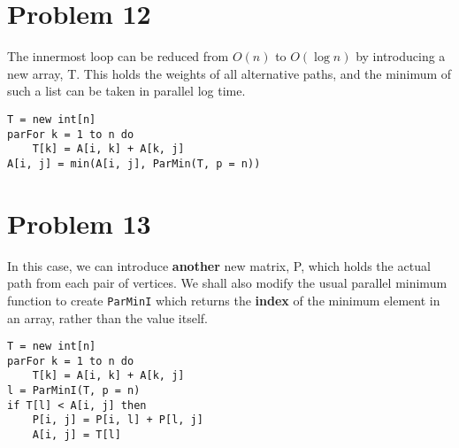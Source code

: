 \documentclass{article}
\providecommand{\prob}[1]{\section*{Problem #1}}
\begin{document}
    \pagebreak
    \prob{12}
        The innermost loop can be reduced from $O(n)$ to $O(\log n)$ by introducing a new array, T.
        This holds the weights of all alternative paths, and the minimum of such a list can be taken in parallel log time.
        \begin{lstlisting}
T = new int[n]
parFor k = 1 to n do
    T[k] = A[i, k] + A[k, j]
A[i, j] = min(A[i, j], ParMin(T, p = n))
        \end{lstlisting}

    \prob{13}
        In this case, we can introduce \textbf{another} new matrix, P, which holds the actual path from each pair of vertices.
        We shall also modify the usual parallel minimum function to create \texttt{ParMinI} which returns the \textbf{index} of the minimum element in an array, rather than the value itself.
        \begin{lstlisting}
T = new int[n]
parFor k = 1 to n do
    T[k] = A[i, k] + A[k, j]
l = ParMinI(T, p = n)
if T[l] < A[i, j] then
    P[i, j] = P[i, l] + P[l, j]
    A[i, j] = T[l]
        \end{lstlisting}
\end{document}
